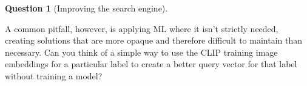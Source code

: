 \documentclass{article}
\theoremstyle{definition}
\newtheorem{subquestion}{Question}[question]
\begin{document}
\begin{subquestion}[Improving the search engine]
\begin{enumerate}
    A common pitfall, however, is applying ML where it isn't strictly needed, creating solutions that are more opaque and therefore difficult to maintain than necessary. Can you think of a simple way to use the CLIP training image embeddings for a particular label to create a better query vector for that label without training a model?
\end{enumerate}
   
\end{subquestion}



 
\end{document}
